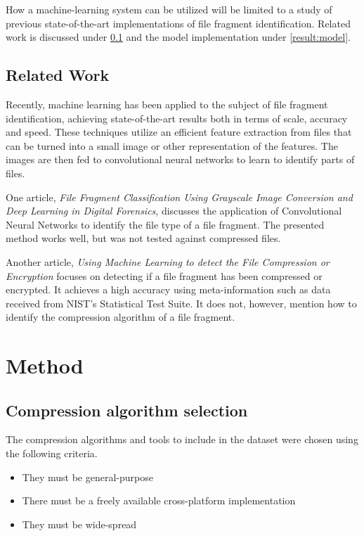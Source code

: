\documentclass[conference]{IEEEtran}
\begin{document}
How a machine-learning system can be utilized will be limited to a study of previous state-of-the-art implementations of file fragment identification. Related work is discussed under \ref{introduction:related} and the model implementation under \ref{result:model}.

\subsection{Related Work}
\label{introduction:related}
Recently, machine learning has been applied to the subject of file fragment identification, achieving state-of-the-art results both in terms of scale, accuracy and speed. These techniques utilize an efficient feature extraction from files that can be turned into a small image or other representation of the features. The images are then fed to convolutional neural networks to learn to identify parts of files.

One article, \textit{File Fragment Classification Using Grayscale Image Conversion and Deep Learning in Digital Forensics}, discusses the application of Convolutional Neural Networks to identify the file type of a file fragment. The presented method works well, but was not tested against compressed files\cite{chen2018}.

Another article, \textit{Using Machine Learning to detect the File Compression or Encryption} focuses on detecting if a file fragment has been compressed or encrypted. It achieves a high accuracy using meta-information such as data received from NIST's Statistical Test Suite. It does not, however, mention how to identify the compression algorithm of a file fragment\cite{hahn2018}.

\section{Method}

\subsection{Compression algorithm selection}

The compression algorithms and tools to include in the dataset were chosen using the following criteria.

\begin{itemize}
    \item They must be general-purpose
    \item There must be a freely available cross-platform implementation
    \item They must be wide-spread
\end{itemize}
\end{document}
